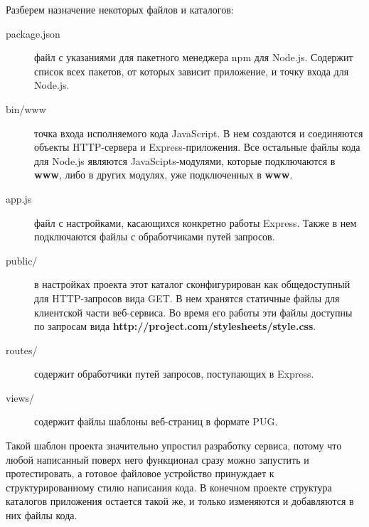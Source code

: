  Разберем назначение некоторых файлов и каталогов:
 \begin{description}
 	\item[package.json] файл с указаниями для пакетного менеджера npm для Node.js. Содержит список всех пакетов, от которых зависит приложение, и точку входа для Node.js.  
 	\item[bin/www] точка входа исполняемого кода JavaScript. В нем создаются и соединяются объекты HTTP-сервера и Express-приложения. Все остальные файлы кода для Node.js являются JavaScipts-модулями, которые подключаются в \textbf{www}, либо в других модулях, уже подключенных в \textbf{www}.
 	\item[app.js] файл с настройками, касающихся конкретно работы Express. Также в нем подключаются файлы с обработчиками путей запросов.   
 	\item[public/] в настройках проекта этот каталог сконфигурирован как общедоступный для  HTTP-запросов вида GET. В нем хранятся статичные файлы для клиентской части веб-сервиса. Во время его работы эти файлы доступны по запросам вида \textbf{http://project.com/stylesheets/style.css}.
 	\item[routes/]   содержит обработчики путей запросов, поступающих в Express.
 	\item[views/]   содержит файлы шаблоны веб-страниц в формате PUG.  
 \end{description}


Такой шаблон проекта значительно упростил разработку сервиса, потому что любой написанный поверх него функционал сразу можно запустить и протестировать, а готовое файловое устройство принуждает к структурированному стилю написания кода. В конечном проекте структура каталогов приложения остается такой же, и только изменяются и добавляются в них файлы кода.      
